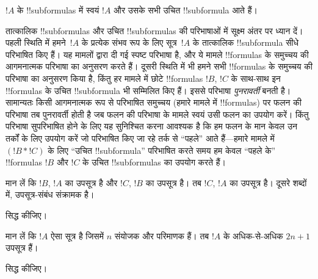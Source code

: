 \documentclass[../../../include/open-logic-section]{subfiles}
\begin{document}
\begin{defn}[!!^{subformula}]
$!A$ के !!{subformula}s में स्वयं $!A$ और उसके सभी उचित !!{subformula} आते
हैं।
\end{defn}

\begin{explain}
तात्कालिक !!{subformula}s और उचित !!{subformula}s की परिभाषाओं में सूक्ष्म
अंतर पर ध्यान दें। पहली स्थिति में हमने~$!A$ के प्रत्येक संभव रूप के लिए
सूत्र~$!A$ के तात्कालिक !!{subformula} सीधे परिभाषित किए हैं। यह मामलों
द्वारा दी गई स्पष्ट परिभाषा है, और ये मामले !!{formula}s के समुच्चय की
आगमनात्मक परिभाषा का अनुसरण करते हैं। दूसरी स्थिति में भी हमने सभी
!!{formula}s के समुच्चय की परिभाषा का अनुसरण किया है, किंतु हर मामले में
छोटे !!{formula}s $!B$, $!C$ के साथ-साथ इन !!{formula}s के उचित
!!{subformula} भी सम्मिलित किए हैं। इससे परिभाषा \emph{पुनरावर्ती} बनती है। सामान्यतः किसी
आगमनात्मक रूप से परिभाषित समुच्चय (हमारे मामले में !!{formula}s) पर फलन की
परिभाषा तब पुनरावर्ती होती है जब फलन की परिभाषा के मामले स्वयं उसी फलन का
उपयोग करें। किंतु परिभाषा सुपरिभाषित होने के लिए यह सुनिश्चित करना आवश्यक है
कि हम फलन के मान केवल उन तर्कों के लिए उपयोग करें जो परिभाषित किए जा रहे तर्क
से ``पहले'' आते हैं---हमारे मामले में $(!B \ast !C)$ के लिए ``उचित
!!{subformula}'' परिभाषित करते समय हम केवल ``पहले के'' !!{formula}s $!B$ और
$!C$ के उचित !!{subformula}s का उपयोग करते हैं।
\end{explain}

\begin{prop}
मान लें कि $!B$, $!A$ का उपसूत्र है और $!C$, $!B$ का उपसूत्र है। तब $!C$,
$!A$ का उपसूत्र है। दूसरे शब्दों में, उपसूत्र-संबंध संक्रामक है।
\end{prop}

\begin{prob}
 सिद्ध कीजिए।
\end{prob}

\begin{prop}
मान लें कि $!A$ ऐसा सूत्र है जिसमें $n$ संयोजक और परिमाणक हैं। तब $!A$ के
अधिक-से-अधिक $2n+1$ उपसूत्र हैं।
\end{prop}

\begin{prob}
 सिद्ध कीजिए।
\end{prob}
\end{document}
